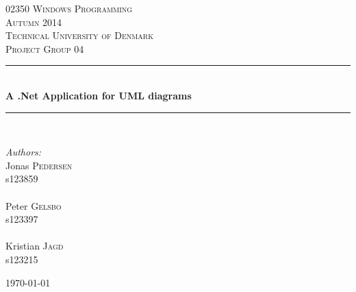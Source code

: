 \documentclass[10pt,a4paper]{article}
\newcommand{\HRule}{\rule{\linewidth}{0.5mm}}
\begin{document}
	\begin{titlepage}
		\begin{center}
			
			
			\textsc{\Large 02350 Windows Programming \\ 
				Autumn 2014 \\ 
				Technical University of Denmark}\\[1.5cm]
			
			\textsc{\Large Project Group 04}\\[0.5cm]
			
			\HRule \\[0.4cm]
			{ \huge \bfseries A .Net Application for UML diagrams \\[0.4cm] }
			
			\HRule \\[1.5cm]
			
			\begin{center}
				\begin{minipage}{0.5\textwidth}
					\begin{flushleft} \large
						\emph{Authors:}\\
						Jonas \textsc{Pedersen} \\
						s123859 \\ ~ \\
						Peter \textsc{Gelsbo} \\
						s123397 \\ ~\\
						Kristian \textsc{Jagd} \\
						s123215
					\end{flushleft}
				\end{minipage}
			\end{center}
			
			
			
			\vfill
			
			{\large \today}
			
		\end{center}
	\end{titlepage}
	
	
	\thispagestyle{empty}
	
	
	\cleardoublepage
	
	
	
	
	
	\newpage
\end{document}
